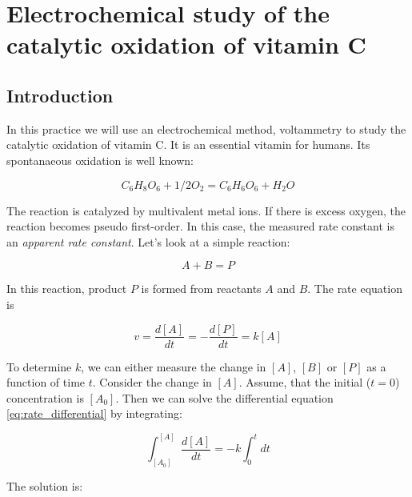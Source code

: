 \fancyhead[LO,RE]{\thesection}
\fancyfoot[LE,RO]{\thepage}

\setcounter{section}{7}
\section{Electrochemical study of the catalytic oxidation of vitamin C}
\subsection{Introduction}
In this practice we will use an electrochemical method, voltammetry to study the catalytic oxidation of vitamin C. It is an essential vitamin for humans. Its spontanaeous oxidation is well known:

\begin{equation}
\label{eq:divider}
        C_6 H_8 O_6
	+
	1/2 O_2
        =
	C_6 H_6 O_6
	+ H_2O
\end{equation}

The reaction is catalyzed by multivalent metal ions. If there is excess oxygen, the reaction becomes pseudo first-order. In this case, the measured rate constant is an \emph{apparent rate constant}. Let's look at a simple reaction:

\begin{equation}
\label{eq:divider}
        A
        +
        B
        =
        P
\end{equation}

In this reaction, product $P$ is formed from reactants $A$ and $B$. The rate equation is

\begin{equation}
\label{eq:rate_differential}
	v
	=
	\frac{d[A]}{dt}
	=
	-\frac{d[P]}{dt}
	=
	k[A]
\end{equation}

To determine $k$, we can either measure the change in $[A]$, $[B]$ or $[P]$ as a function of time $t$. Consider the change in $[A]$. Assume, that the initial ($t = 0$) concentration is $[A_0]$. Then we can solve the differential equation \ref{eq:rate_differential} by integrating:

\begin{equation}
\label{eq:rate}
        \int_{[A_0]}^{[A]}
        \frac{d[A]}{dt}
        =
        -k \int_0^t
	dt
\end{equation}
 
The solution is:

